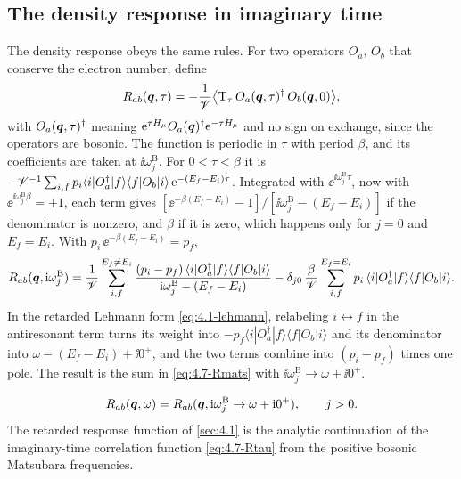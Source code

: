 \subsection{The density response in imaginary time}

The density response obeys the same rules. For two operators $O_a$, $O_b$ that conserve the electron number, define
\begin{equation}
  R_{ab}(\bm{q},\tau) = -\frac{1}{\mathscr{V}}\bigl\langle\mathrm{T}_\tau\,O_a(\bm{q},\tau)^\dagger\,O_b(\bm{q},0)\bigr\rangle ,
  \label{eq:4.7-Rtau}
\end{equation}
with $O_a(\bm{q},\tau)^\dagger$ meaning $\mathrm{e}^{\tau H_\mu}O_a(\bm{q})^\dagger\mathrm{e}^{-\tau H_\mu}$ and no sign on exchange, since the operators are bosonic. The function is periodic in $\tau$ with period $\beta$, and its coefficients are taken at $\ii\omega^{\mathrm{B}}_j$. For $0 < \tau < \beta$ it is $-\mathscr{V}^{-1}\sum_{i,f}p_i\langle i|O_a^\dagger|f\rangle\langle f|O_b|i\rangle\,\mathrm{e}^{-(E_f - E_i)\tau}$. Integrated with $\ee^{\ii\omega^{\mathrm{B}}_j\tau}$, now with $\ee^{\ii\omega^{\mathrm{B}}_j\beta} = +1$, each term gives $[\ee^{-\beta(E_f - E_i)} - 1]/[\ii\omega^{\mathrm{B}}_j - (E_f - E_i)]$ if the denominator is nonzero, and $\beta$ if it is zero, which happens only for $j = 0$ and $E_f = E_i$. With $p_i\,\ee^{-\beta(E_f - E_i)} = p_f$,
\begin{equation}
  R_{ab}(\bm{q},\mathrm{i}\omega^{\mathrm{B}}_j) = \frac{1}{\mathscr{V}}\sum_{i,f}^{E_f \ne E_i}\frac{(p_i - p_f)\,\langle i|O_a^\dagger|f\rangle\langle f|O_b|i\rangle}{\mathrm{i}\omega^{\mathrm{B}}_j - (E_f - E_i)}
  - \delta_{j0}\,\frac{\beta}{\mathscr{V}}\sum_{i,f}^{E_f = E_i}p_i\,\langle i|O_a^\dagger|f\rangle\langle f|O_b|i\rangle .
  \label{eq:4.7-Rmats}
\end{equation}
In the retarded Lehmann form \cref{eq:4.1-lehmann}, relabeling $i \leftrightarrow f$ in the antiresonant term turns its weight into $-p_f\langle i|O_a^\dagger|f\rangle\langle f|O_b|i\rangle$ and its denominator into $\omega - (E_f - E_i) + \ii0^+$, and the two terms combine into $(p_i - p_f)$ times one pole. The result is the sum in \cref{eq:4.7-Rmats} with $\ii\omega^{\mathrm{B}}_j \to \omega + \ii0^+$.
\begin{keyresult}
\begin{equation}
  R_{ab}(\bm{q},\omega) = R_{ab}(\bm{q},\mathrm{i}\omega^{\mathrm{B}}_j \to \omega + \mathrm{i}0^+), \qquad j > 0 .
  \label{eq:4.7-Rcont}
\end{equation}
The retarded response function of \cref{sec:4.1} is the analytic continuation of the imaginary-time correlation function \cref{eq:4.7-Rtau} from the positive bosonic Matsubara frequencies.
\end{keyresult}
